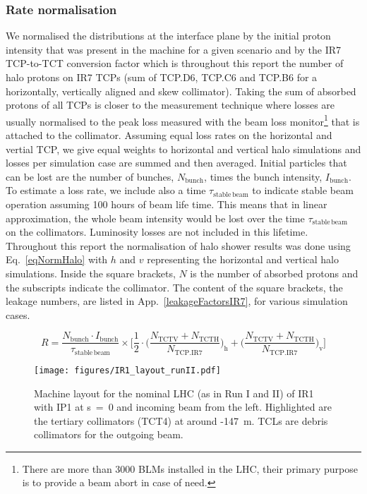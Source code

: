 \subsubsection{Rate normalisation}



We normalised the distributions at the interface plane by the initial proton intensity that was present in the machine for a given scenario and by the IR7 TCP-to-TCT conversion factor which is throughout this report the number of halo protons on IR7 TCPs (sum of TCP.D6, TCP.C6 and TCP.B6 for a horizontally, vertically aligned and skew collimator). Taking the sum of absorbed protons of all TCPs is closer to the measurement technique where losses are usually normalised to the peak loss measured with the beam loss monitor\footnote{There are more than 3000 BLMs installed in the LHC, their primary purpose is to provide a beam abort in case of need.} that is attached to the collimator. Assuming equal loss rates on the horizontal and vertial TCP, we give equal weights to horizontal and vertical halo simulations and losses per simulation case are summed and then averaged. Initial particles that can be lost are the number of bunches, $N_{\mathrm{bunch}}$, times the bunch intensity, $I_{\mathrm{bunch}}$. To estimate a loss rate, we include also a time $\tau_\mathrm{stable \, beam}$ to indicate stable beam operation assuming 100 hours of beam life time. This means that in linear approximation, the whole beam intensity would be lost over the time $\tau_{\mathrm{stable \, beam}}$ on the collimators. Luminosity losses are not included in this lifetime. Throughout this report the normalisation of halo shower results was done using Eq.~\ref{eqNormHalo} with $h$ and $v$ representing the horizontal and vertical halo simulations. Inside the square brackets, $N$ is the number of absorbed protons and the subscripts indicate the collimator. The content of the square brackets, the leakage numbers, are listed in App.~\ref{leakageFactorsIR7}, for various simulation cases.

\begin{equation} \label{eqNormHalo}
R = \frac{N_{\mathrm{bunch}} \cdot I_{\mathrm{bunch}}}{\tau_{\mathrm{stable \, beam}}} \times \Bigg[ \frac{1}{2} \cdot \Big( \frac{N_{\mathrm{TCTV}} + N_{\mathrm{TCTH}}}{N_{\mathrm{TCP.IR7}}}\Big)_{\mathrm{h}} + \Big( \frac{N_{\mathrm{TCTV}} + N_{\mathrm{TCTH}}}{N_{\mathrm{TCP.IR7}}} \Big)_{\mathrm{v}}  \Bigg]
\end{equation}


\begin{figure}%
\begin{center}
\texttt{[image: figures/IR1\_layout\_runII.pdf]}
\end{center}
\vspace{-0.6cm}
 \caption{Machine layout for the nominal LHC (as in Run I and II) of IR1 with IP1 at s~=~0 and incoming beam from the left. Highlighted are the tertiary collimators (TCT4) at around -147~m. TCLs are debris collimators for the outgoing beam.
  \label{nominalLHC_layout}}
\end{figure}


